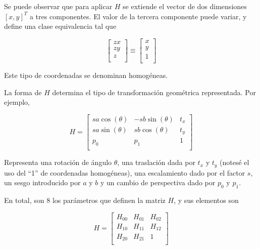 \documentclass[a4paper,10pt]{article}
\begin{document}
Se puede observar que para aplicar $H$ se extiende el vector de dos dimensiones $[x,y]^{T}$ a tres componentes. El valor de la
tercera componente puede variar, y define una clase equivalencia tal que

\begin{equation}
    \begin{bmatrix}
        zx \\
        zy \\
        z \\
    \end{bmatrix}
    \equiv
    \begin{bmatrix}
        x \\
        y \\
        1 \\
    \end{bmatrix}
\end{equation}

Este tipo de coordenadas se denominan homogéneas.

La forma de $H$ determina el tipo de transformación geométrica representada. Por ejemplo,

\begin{equation}
    H =
    \begin{bmatrix}
        sa\cos(\theta) & -sb\sin(\theta) & t_{x}\\
        sa\sin(\theta) & sb\cos(\theta) & t_{y} \\
        p_{0}          & p_{1}          & 1     \\
    \end{bmatrix}
\end{equation}

Representa una rotación de ángulo $\theta$, una traslación dada por $t_{x}$ y $t_{y}$ (notesé el uso del ``1'' de coordenadas
homogéneas), una escalamiento dado por el factor $s$, un sesgo introducido por $a$ y $b$ y un cambio de perspectiva
dado por $p_{0}$ y $p_{1}$.

En total, son 8 los parámetros que definen la matriz $H$, y sus elementos son

\begin{equation}
    H =
    \begin{bmatrix}
        H_{00} & H_{01} & H_{02}\\
        H_{10} & H_{11} & H_{12}\\
        H_{20} & H_{21} & 1\\
    \end{bmatrix}
\end{equation}
\end{document}
